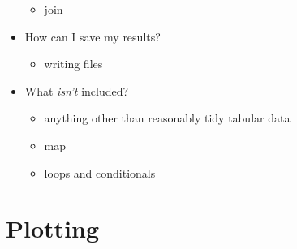 \documentclass[]{Nemilov}
\providecommand{\tightlist}{%
  \setlength{\itemsep}{0pt}\setlength{\parskip}{0pt}}
\begin{document}
\begin{itemize}
  \begin{itemize}
  \tightlist
  \item
    join
  \end{itemize}
\item
  How can I save my results?

  \begin{itemize}
  \tightlist
  \item
    writing files
  \end{itemize}
\item
  What \emph{isn't} included?

  \begin{itemize}
  \tightlist
  \item
    anything other than reasonably tidy tabular data
  \item
    map
  \item
    loops and conditionals
  \end{itemize}
\end{itemize}

\hypertarget{plotting}{%
\section{Plotting}\label{plotting}}
\end{document}
